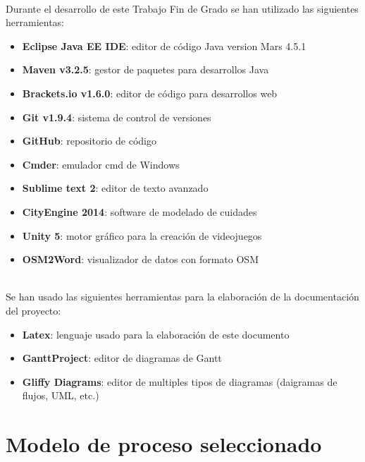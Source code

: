 \newpage       
{}\\

Durante el desarrollo de este Trabajo Fin de Grado se han utilizado las siguientes herramientas:

\begin{itemize}
       \item {\bfseries Eclipse Java EE IDE}: editor de código Java version Mars 4.5.1
       \item {\bfseries Maven v3.2.5}: gestor de paquetes para desarrollos Java
       \item {\bfseries Brackets.io v1.6.0}: editor de código para desarrollos web
       \item {\bfseries Git v1.9.4}: sistema de control de versiones
       \item {\bfseries GitHub}: repositorio de código
       \item {\bfseries Cmder}: emulador cmd de Windows 
       \item {\bfseries Sublime text 2}: editor de texto avanzado
       \item {\bfseries CityEngine 2014}: software de modelado de cuidades
       \item {\bfseries Unity 5}: motor gráfico para la creación de videojuegos
       \item {\bfseries OSM2Word}: visualizador de datos con formato OSM
\end{itemize}

\\

Se han usado las siguientes herramientas para la elaboración de la documentación del proyecto:

\begin{itemize}
       \item {\bfseries Latex}: lenguaje usado para la elaboración de este documento
       \item {\bfseries GanttProject}: editor de diagramas de Gantt
       \item {\bfseries Gliffy Diagrams}: editor de multiples tipos de diagramas (daigramas de flujos, UML, etc.)
\end{itemize}


\section{Modelo de proceso seleccionado}


